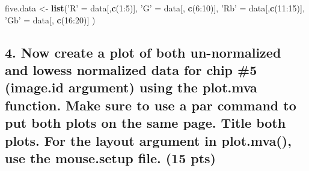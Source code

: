 \documentclass[]{article}
\newenvironment{Shaded}{\begin{snugshade}}{\end{snugshade}}
\newcommand{\KeywordTok}[1]{\textcolor[rgb]{0.13,0.29,0.53}{\textbf{{#1}}}}
\newcommand{\DataTypeTok}[1]{\textcolor[rgb]{0.13,0.29,0.53}{{#1}}}
\newcommand{\DecValTok}[1]{\textcolor[rgb]{0.00,0.00,0.81}{{#1}}}
\newcommand{\StringTok}[1]{\textcolor[rgb]{0.31,0.60,0.02}{{#1}}}
\newcommand{\NormalTok}[1]{{#1}}
\begin{document}
\begin{Shaded}
\begin{Highlighting}[]
\NormalTok{five.data <-}\StringTok{ }\KeywordTok{list}\NormalTok{(}\StringTok{'R'} \NormalTok{=}\StringTok{ }\NormalTok{data[,}\KeywordTok{c}\NormalTok{(}\DecValTok{1}\NormalTok{:}\DecValTok{5}\NormalTok{)],}
                  \StringTok{'G'} \NormalTok{=}\StringTok{ }\NormalTok{data[, }\KeywordTok{c}\NormalTok{(}\DecValTok{6}\NormalTok{:}\DecValTok{10}\NormalTok{)],}
                  \StringTok{'Rb'} \NormalTok{=}\StringTok{ }\NormalTok{data[,}\KeywordTok{c}\NormalTok{(}\DecValTok{11}\NormalTok{:}\DecValTok{15}\NormalTok{)],}
                  \StringTok{'Gb'} \NormalTok{=}\StringTok{ }\NormalTok{data[, }\KeywordTok{c}\NormalTok{(}\DecValTok{16}\NormalTok{:}\DecValTok{20}\NormalTok{)]}
                  \NormalTok{)}
\end{Highlighting}
\end{Shaded}

\newpage

\subsection{4. Now create a plot of both un-normalized and lowess
normalized data for chip \#5 (image.id argument) using the plot.mva
function. Make sure to use a par command to put both plots on the same
page. Title both plots. For the layout argument in plot.mva(), use the
mouse.setup file. (15
pts)}\label{now-create-a-plot-of-both-un-normalized-and-lowess-normalized-data-for-chip-5-image.id-argument-using-the-plot.mva-function.-make-sure-to-use-a-par-command-to-put-both-plots-on-the-same-page.-title-both-plots.-for-the-layout-argument-in-plot.mva-use-the-mouse.setup-file.-15-pts}

\begin{Shaded}
\end{Shaded}
\end{document}
